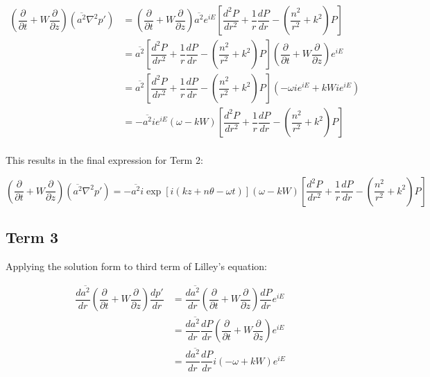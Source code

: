\documentclass[]{aiaa-tc}%
\begin{document}
\begin{align*}
\left( \dfrac{\partial}{\partial t}
  + W \dfrac{\partial}{\partial z} \right)
  (\overline{a^2}\nabla^2p')
&= \left( \dfrac{\partial}{\partial t}
  + W \dfrac{\partial}{\partial z}
  \right) \overline{a^2} e^{iE} \left[
      \dfrac{d^2P}{dr^2}
    + \dfrac{1}{r} \dfrac{dP}{dr}
    - \left( \dfrac{n^2}{r^2} + k^2 \right) P \right] \\
&= \overline{a^2} \left[ \dfrac{d^2P}{dr^2}
          + \dfrac{1}{r} \dfrac{dP}{dr}
          - \left( \dfrac{n^2}{r^2} + k^2 \right) P \right]
    \left( \dfrac{\partial}{\partial t}
  + W \dfrac{\partial}{\partial z}
  \right) e^{iE} \\
&= \overline{a^2} \left[ \dfrac{d^2P}{dr^2}
          + \dfrac{1}{r} \dfrac{dP}{dr}
          - \left( \dfrac{n^2}{r^2} + k^2 \right) P \right]
  \left( -\omega ie^{iE} + kW ie^{iE}\right) \\
&= - \overline{a^2} ie^{iE} (\omega - kW) \left[ \dfrac{d^2P}{dr^2}
          + \dfrac{1}{r} \dfrac{dP}{dr}
          - \left( \dfrac{n^2}{r^2} + k^2 \right) P \right] \\
\end{align*}

This results in the final expression for Term 2:

\begin{equation} \label{term2soln}
\boxed{ \left( \dfrac{\partial}{\partial t}
  + W \dfrac{\partial}{\partial z} \right)
  (\overline{a^2}\nabla^2p')
= - \overline{a^2} i\exp[i(kz + n\theta -\omega t)]
    (\omega - kW) \left[ \dfrac{d^2P}{dr^2}
    + \dfrac{1}{r} \dfrac{dP}{dr}
    - \left( \dfrac{n^2}{r^2} + k^2 \right) P \right] }
\end{equation}





\clearpage
\subsection{Term 3}

Applying the solution form to third term of Lilley's equation:

\begin{align*}
\dfrac{d \overline{a^2}}{dr} \left( \dfrac{\partial}{\partial t} + W \dfrac{\partial}{\partial z} \right) \dfrac{dp'}{dr}
&= \dfrac{d \overline{a^2}}{dr}
   \left( \dfrac{\partial}{\partial t} + W \dfrac{\partial}{\partial z} \right)
   \dfrac{dP}{dr} e^{iE}  \\
&= \dfrac{d \overline{a^2}}{dr} \dfrac{dP}{dr}
   \left( \dfrac{\partial}{\partial t} + W \dfrac{\partial}{\partial z} \right) e^{iE} \\
&= \dfrac{d \overline{a^2}}{dr} \dfrac{dP}{dr}
    i(-\omega + kW) e^{iE} \\
\end{align*}
\end{document}
